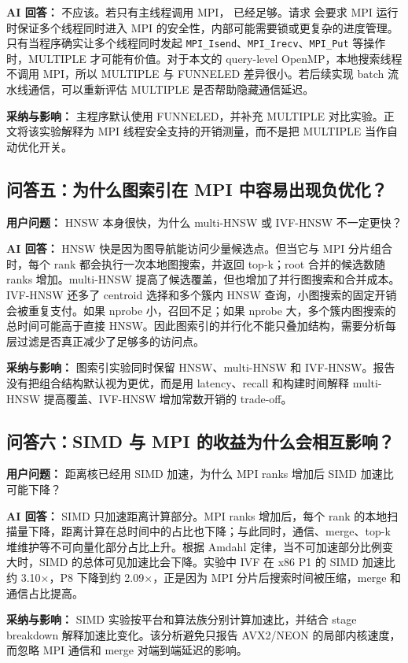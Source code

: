 \documentclass[11pt,a4paper]{article}
\begin{document}
\textbf{AI 回答：} 不应该。若只有主线程调用 MPI， 已经足够。请求  会要求 MPI 运行时保证多个线程同时进入 MPI 的安全性，内部可能需要锁或更复杂的进度管理。只有当程序确实让多个线程同时发起 \texttt{MPI\_Isend}、\texttt{MPI\_Irecv}、\texttt{MPI\_Put} 等操作时，MULTIPLE 才可能有价值。对于本文的 query-level OpenMP，本地搜索线程不调用 MPI，所以 MULTIPLE 与 FUNNELED 差异很小。若后续实现 batch 流水线通信，可以重新评估 MULTIPLE 是否帮助隐藏通信延迟。

\textbf{采纳与影响：} 主程序默认使用 FUNNELED，并补充 MULTIPLE 对比实验。正文将该实验解释为 MPI 线程安全支持的开销测量，而不是把 MULTIPLE 当作自动优化开关。

\subsection*{问答五：为什么图索引在 MPI 中容易出现负优化？}
\textbf{用户问题：} HNSW 本身很快，为什么 multi-HNSW 或 IVF-HNSW 不一定更快？

\textbf{AI 回答：} HNSW 快是因为图导航能访问少量候选点。但当它与 MPI 分片组合时，每个 rank 都会执行一次本地图搜索，并返回 top-k；root 合并的候选数随 ranks 增加。multi-HNSW 提高了候选覆盖，但也增加了并行图搜索和合并成本。IVF-HNSW 还多了 centroid 选择和多个簇内 HNSW 查询，小图搜索的固定开销会被重复支付。如果 nprobe 小，召回不足；如果 nprobe 大，多个簇内图搜索的总时间可能高于直接 HNSW。因此图索引的并行化不能只叠加结构，需要分析每层过滤是否真正减少了足够多的访问点。

\textbf{采纳与影响：} 图索引实验同时保留 HNSW、multi-HNSW 和 IVF-HNSW。报告没有把组合结构默认视为更优，而是用 latency、recall 和构建时间解释 multi-HNSW 提高覆盖、IVF-HNSW 增加常数开销的 trade-off。

\subsection*{问答六：SIMD 与 MPI 的收益为什么会相互影响？}
\textbf{用户问题：} 距离核已经用 SIMD 加速，为什么 MPI ranks 增加后 SIMD 加速比可能下降？

\textbf{AI 回答：} SIMD 只加速距离计算部分。MPI ranks 增加后，每个 rank 的本地扫描量下降，距离计算在总时间中的占比也下降；与此同时，通信、merge、top-k 堆维护等不可向量化部分占比上升。根据 Amdahl 定律，当不可加速部分比例变大时，SIMD 的总体可见加速比会下降。实验中 IVF 在 x86 P1 的 SIMD 加速比约 3.10$\times$，P8 下降到约 2.09$\times$，正是因为 MPI 分片后搜索时间被压缩，merge 和通信占比提高。

\textbf{采纳与影响：} SIMD 实验按平台和算法族分别计算加速比，并结合 stage breakdown 解释加速比变化。该分析避免只报告 AVX2/NEON 的局部内核速度，而忽略 MPI 通信和 merge 对端到端延迟的影响。
\end{document}
